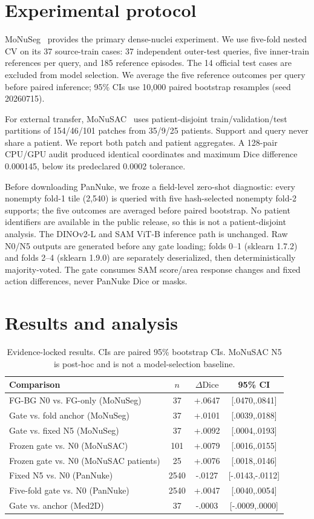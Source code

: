 \documentclass[10pt,twocolumn]{article}
\newcommand{\dice}{\mathrm{Dice}}
\begin{document}
\section{Experimental protocol}
MoNuSeg~\cite{kumar2019monuseg} provides the primary dense-nuclei experiment. We use five-fold nested CV on its 37 source-train cases: 37 independent outer-test queries, five inner-train references per query, and 185 reference episodes. The 14 official test cases are excluded from model selection. We average the five reference outcomes per query before paired inference; 95\% CIs use 10,000 paired bootstrap resamples (seed 20260715).

For external transfer, MoNuSAC~\cite{verma2021monusac} uses patient-disjoint train/validation/test partitions of 154/46/101 patches from 35/9/25 patients. Support and query never share a patient. We report both patch and patient aggregates. A 128-pair CPU/GPU audit produced identical coordinates and maximum Dice difference 0.000145, below its predeclared 0.0002 tolerance.

Before downloading PanNuke, we froze a field-level zero-shot diagnostic: every nonempty fold-1 tile (2,540) is queried with five hash-selected nonempty fold-2 supports; the five outcomes are averaged before paired bootstrap. No patient identifiers are available in the public release, so this is not a patient-disjoint analysis. The DINOv2-L and SAM ViT-B inference path is unchanged. Raw N0/N5 outputs are generated before any gate loading; folds 0--1 (sklearn 1.7.2) and folds 2--4 (sklearn 1.9.0) are separately deserialized, then deterministically majority-voted. The gate consumes SAM score/area response changes and fixed action differences, never PanNuke Dice or masks.

\section{Results and analysis}
\begin{table}[t]
\caption{Evidence-locked results. CIs are paired 95\% bootstrap CIs. MoNuSAC N5 is post-hoc and is not a model-selection baseline.}
\centering\scriptsize
\begin{tabular}{lccc}
\hline
Comparison & $n$ & $\Delta\dice$ & 95\% CI\\
\hline
FG-BG N0 vs. FG-only (MoNuSeg) & 37 & +.0647 & [.0470,.0841]\\
Gate vs. fold anchor (MoNuSeg) & 37 & +.0101 & [.0039,.0188]\\
Gate vs. fixed N5 (MoNuSeg) & 37 & +.0092 & [.0004,.0193]\\
Frozen gate vs. N0 (MoNuSAC) & 101 & +.0079 & [.0016,.0155]\\
Frozen gate vs. N0 (MoNuSAC patients) & 25 & +.0076 & [.0018,.0146]\\
Fixed N5 vs. N0 (PanNuke) & 2540 & -.0127 & [-.0143,-.0112]\\
Five-fold gate vs. N0 (PanNuke) & 2540 & +.0047 & [.0040,.0054]\\
Gate vs. anchor (Med2D) & 37 & -.0003 & [-.0009,.0000]\\
\hline
\end{tabular}
\label{tab:effects}
\end{table}
\end{document}
